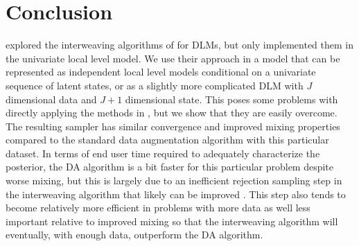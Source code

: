 \documentclass[graybox]{svmult}
\begin{document}
\section{Conclusion}\label{sec:conclusion}
\citet{simpson2014interweaving} explored the interweaving algorithms of \citet{yu2011center} for DLMs, but only implemented them in the univariate local level model. We use their approach in a model that can be represented as independent local level models conditional on a univariate sequence of latent states, or as a slightly more complicated DLM with $J$ dimensional data and $J+1$ dimensional state. This poses some problems with directly applying the methods in \citet{simpson2014interweaving}, but we show that they are easily overcome. The resulting sampler has similar convergence and improved mixing properties compared to the standard data augmentation algorithm with this particular dataset. In terms of end user time required to adequately characterize the posterior, the DA algorithm is a bit faster for this particular problem despite worse mixing, but this is largely due to an inefficient rejection sampling step in the interweaving algorithm that likely can be improved \citep{simpson2014interweaving}. This step also tends to become relatively more efficient in problems with more data as well less important relative to improved mixing so that the interweaving algorithm will eventually, with enough data, outperform the DA algorithm.



\end{document}
